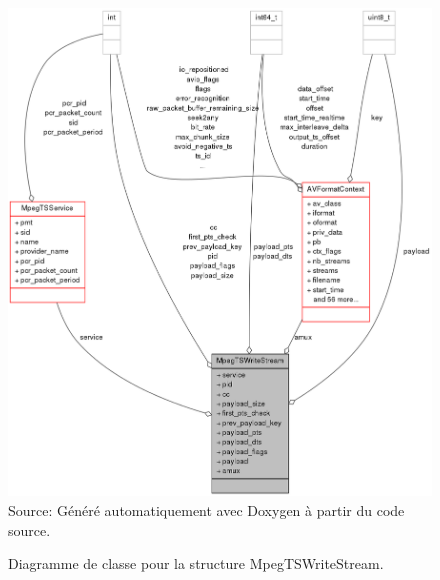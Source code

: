 \documentclass[12pt,a4paper]{article}
\begin{document}
\begin{figure}[!b]
\centering
\caption{Diagramme de classe pour la structure MpegTSWriteStream.}
\includegraphics[width=0.9\linewidth]{pictures/structMpegTSWriteStream__coll__graph.png}
\\Source: Généré automatiquement avec Doxygen à partir du code source.
\label{fig:structMpegTSWriteStream__coll__graph}
\end{figure}
\end{document}
